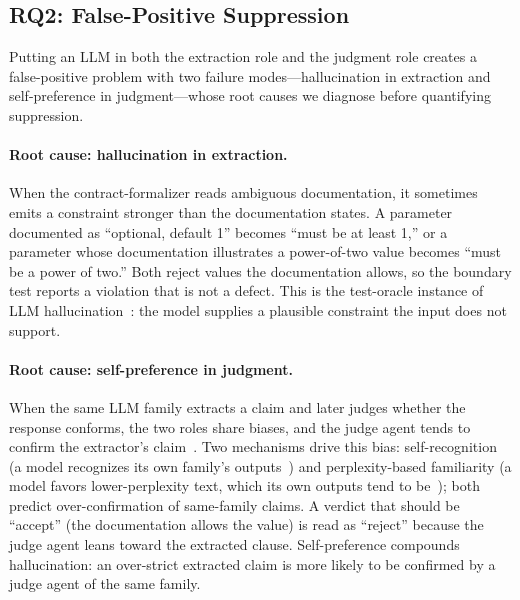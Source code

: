 \documentclass[sigconf]{acmart}
\begin{document}
\subsection{RQ2: False-Positive Suppression}
\label{subsec:rq2}

Putting an LLM in both the extraction role and the judgment role creates a false-positive problem with two failure modes---hallucination in extraction and self-preference in judgment---whose root causes we diagnose before quantifying suppression.

\paragraph{Root cause: hallucination in extraction.}
When the contract-formalizer reads ambiguous documentation, it sometimes emits a constraint stronger than the documentation states. A parameter documented as ``optional, default 1'' becomes ``must be at least 1,'' or a parameter whose documentation illustrates a power-of-two value becomes ``must be a power of two.'' Both reject values the documentation allows, so the boundary test reports a violation that is not a defect. This is the test-oracle instance of LLM hallucination~\cite{ji23hall}: the model supplies a plausible constraint the input does not support.

\paragraph{Root cause: self-preference in judgment.}
When the same LLM family extracts a claim and later judges whether the response conforms, the two roles share biases, and the judge agent tends to confirm the extractor's claim~\cite{panickssery24,wataoka24}. Two mechanisms drive this bias: self-recognition (a model recognizes its own family's outputs~\cite{panickssery24}) and perplexity-based familiarity (a model favors lower-perplexity text, which its own outputs tend to be~\cite{wataoka24}); both predict over-confirmation of same-family claims. A verdict that should be ``accept'' (the documentation allows the value) is read as ``reject'' because the judge agent leans toward the extracted clause. Self-preference compounds hallucination: an over-strict extracted claim is more likely to be confirmed by a judge agent of the same family.
\end{document}
